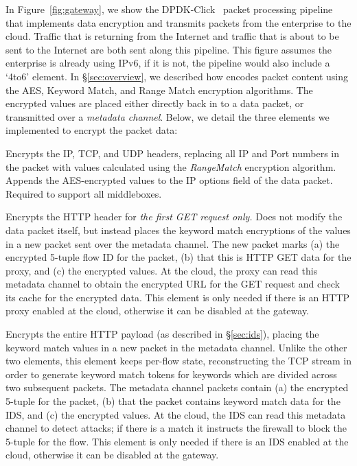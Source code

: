  In Figure~\ref{fig:gateway}, we show the DPDK-Click~\cite{click} packet processing pipeline that implements data encryption and transmits packets from the enterprise to the cloud.
Traffic that is returning from the Internet and traffic that is about to be sent to the Internet are both sent along this pipeline.
This figure assumes the enterprise is already using IPv6, if it is not, the pipeline would also include a `4to6' element.
In \S\ref{sec:overview}, we described how \sys encodes packet content using the AES, Keyword Match, and Range Match encryption algorithms. 
The encrypted values are placed either directly back in to a data packet, or transmitted over a {\it metadata channel}.
Below, we detail the three elements we implemented to encrypt the packet data:

 Encrypts the IP, TCP, and UDP headers, replacing all IP and Port numbers in the packet with values calculated using the {\it RangeMatch} encryption algorithm. Appends the AES-encrypted values to the IP options field of the data packet.
Required to support all middleboxes. 

 Encrypts the HTTP header for {\it the first GET request only.} Does not modify the data packet itself, but instead places the keyword match encryptions of the values in a new packet sent over the metadata channel. 
The new packet marks (a) the encrypted 5-tuple flow ID for the packet, (b) that this is HTTP GET data for the proxy, and (c) the encrypted values. At the cloud, the proxy can read this metadata channel to obtain the encrypted URL for the GET request and check its cache for the encrypted data. This element is only needed if there is an HTTP proxy enabled at the cloud, otherwise it can be disabled at the gateway.

 Encrypts the entire HTTP payload (as described in \S\ref{sec:ids}), placing the keyword match values in a new packet in the metadata channel. Unlike the other two elements, this element keeps per-flow state, reconstructing the TCP stream in order to generate keyword match tokens for keywords which are divided across two subsequent packets.  The metadata channel packets contain (a) the encrypted 5-tuple for the packet, (b) that the packet contains keyword match data for the IDS, and (c) the encrypted values. At the cloud, the IDS can read this metadata channel to detect attacks; if there is a match it instructs the firewall to block the 5-tuple for the flow. This element is only needed if there is an IDS enabled at the cloud, otherwise it can be disabled at the gateway.


